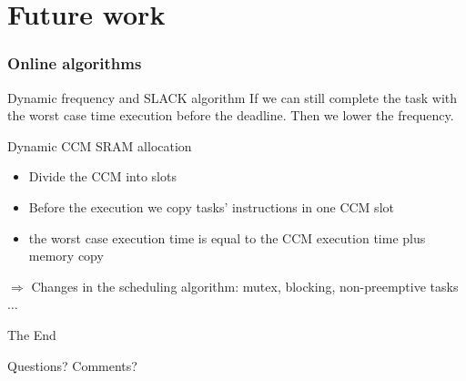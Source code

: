 \documentclass[
	11pt, %
]{beamer}
\begin{document}
\section{Future work}
\begin{frame}
	\frametitle{Online algorithms}
	\begin{block}{Dynamic frequency and SLACK algorithm}
		If we can still complete the task with the worst case time execution before the deadline. Then we lower the frequency. 
	\end{block}
	\begin{block}{Dynamic CCM SRAM allocation}
		\begin{itemize}
			\item Divide the CCM into slots
			\item Before the execution we copy tasks' instructions in one CCM slot
			\item the worst case execution time is equal to the CCM execution time plus memory copy
			
		\end{itemize}
		$\Rightarrow$ Changes in the scheduling algorithm: mutex, blocking, non-preemptive tasks $\ldots$

	\end{block}
\end{frame}





\begin{frame}[plain] %
	\begin{center}
		{\Huge The End}
		
		\bigskip\bigskip %
		
		{\LARGE Questions? Comments?}
	\end{center}
\end{frame}

\end{document}
